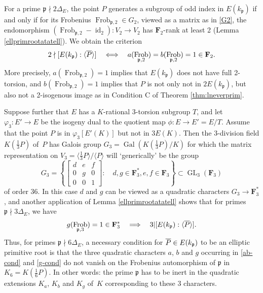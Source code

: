 \documentclass{amsart}
\theoremstyle{plain}
\theoremstyle{definition}
\DeclareMathOperator{\Frob}{Frob}
\DeclareMathOperator{\id}{id}
\DeclareMathOperator{\GL}{GL}
\DeclareMathOperator{\Gal}{Gal}
\newcommand{\FF}{{\mathbf{F}}}
\newcommand{\gothp}{{\mathfrak{p}}}
\newcommand{\mybar}[1]{
  \mathchoice
  {#1\llap{$\overline{\phantom{\displaystyle\rm#1}}$}}
  {#1\llap{$\overline{\phantom{\textstyle\rm#1}}$}}
  {#1\llap{$\overline{\phantom{\scriptstyle\rm#1}}$}}
  {#1\llap{$\overline{\phantom{\scriptscriptstyle\rm#1}}$}}
}
\renewcommand{\bar}{\mybar}
\begin{document}
For a prime $\gothp\nmid 2\Delta_E$, the point $P$ generates 
a subgroup of odd index in $E(k_\gothp)$ if and only if for its
Frobenius $\Frob_{\gothp,2}\in G_2$, viewed as a matrix as in 
\eqref{G2}, the endomorphism $(\Frob_{\gothp,2}-\id_2): V_2\to V_2$ 
has $\FF_2$-rank at least 2  (Lemma \ref{ellprimrootatatell}).
We obtain the criterion
\begin{equation}
\label{ab-cond}
2\nmid [E(k_\gothp):\langle \bar P\rangle]
\quad \Longleftrightarrow \quad 
a(\Frob_{\gothp,2})=b(\Frob_{\gothp,2})=1\in \FF_2.
\end{equation}
More precisely, $a(\Frob_{\gothp,2})=1$ implies that $E(k_\gothp)$ does not have full 2-torsion, 
and $b(\Frob_{\gothp,2})=1$ implies that $P$ is not only not in $2E(k_\gothp)$,
but also not a 2-isogenous image as in Condition C of Theorem \ref{thm:lneverprim}.

Suppose further that $E$ has a $K$-rational 3-torsion subgroup $T$, and let
$\varphi_3:E'\to E$ be the isogeny dual to the quotient map $\phi:E\to E'=E/T$.
Assume that the point $P$ is in $\varphi_3[E'(K)]$ but not in $3E(K)$.
Then the 3-division field $K(\frac13 P)$ of~$P$ has Galois group $G_3=\Gal(K(\frac13 P)/K)$
for which the matrix representation 
on $V_3=\langle\frac13 P\rangle/\langle P\rangle$ will `generically' be the group
\begin{equation}
\label{G3}
G_3=
\left\{ \begin{bmatrix}
d & e & f \\
0 & g & 0 \\
0 & 0 & 1 
\end{bmatrix}: \quad d,g \in \FF_3^*,  e,f \in\FF_3 \right\}\subset \GL_3(\FF_3)
\end{equation}
of order 36.
In this case $d$ and $g$ can be viewed as a quadratic characters $G_3\to \FF_3^*$, 
and another application of Lemma \ref{ellprimrootatatell} shows that for primes 
$\gothp\nmid 3\Delta_E$, we have 
\begin{equation}
\label{g-cond}
g(\Frob_{\gothp,3})=1\in \FF_3^*
\quad \Longrightarrow \quad 
3 | [E(k_\gothp):\langle \bar P\rangle].
\end{equation}
Thus, for primes $\gothp\nmid 6\Delta_E$, a necessary condition for $\bar P \in E(k_\gothp)$ to 
be an elliptic primitive root is that the three quadratic characters $a$, $b$ and $g$
occurring in \eqref{ab-cond} and \eqref{g-cond} do not vanish on the Frobenius automorphism
of $\gothp$ in $K_6=K(\frac16P)$.
In other words: the prime $\gothp$ has to be inert in the quadratic extensions 
$K_a$, $K_b$ and $K_g$ of~$K$ corresponding to these 3 characters.
\end{document}
